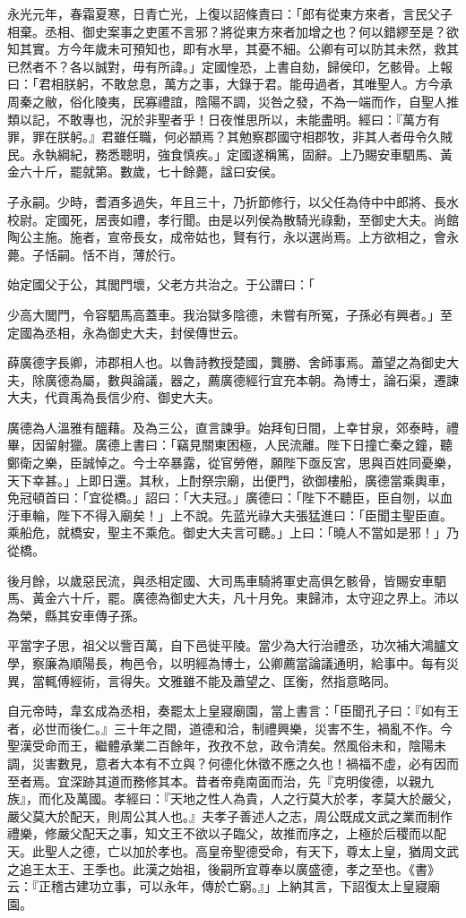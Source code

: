 \begin{pinyinscope}
永光元年，春霜夏寒，日青亡光，上復以詔條責曰：「郎有從東方來者，言民父子相棄。丞相、御史案事之吏匿不言邪？將從東方來者加增之也？何以錯繆至是？欲知其實。方今年歲未可預知也，即有水旱，其憂不細。公卿有可以防其未然，救其已然者不？各以誠對，毋有所諱。」定國惶恐，上書自劾，歸侯印，乞骸骨。上報曰：「君相朕躬，不敢怠息，萬方之事，大錄于君。能毋過者，其唯聖人。方今承周秦之敝，俗化陵夷，民寡禮誼，陰陽不調，災咎之發，不為一端而作，自聖人推類以記，不敢專也，況於非聖者乎！日夜惟思所以，未能盡明。經曰：『萬方有罪，罪在朕躬。』君雖任職，何必顓焉？其勉察郡國守相郡牧，非其人者毋令久賊民。永執綱紀，務悉聰明，強食慎疾。」定國遂稱篤，固辭。上乃賜安車駟馬、黃金六十斤，罷就第。數歲，七十餘薨，諡曰安侯。

子永嗣。少時，耆酒多過失，年且三十，乃折節修行，以父任為侍中中郎將、長水校尉。定國死，居喪如禮，孝行聞。由是以列侯為散騎光祿勳，至御史大夫。尚館陶公主施。施者，宣帝長女，成帝姑也，賢有行，永以選尚焉。上方欲相之，會永薨。子恬嗣。恬不肖，薄於行。

始定國父于公，其閭門壞，父老方共治之。于公謂曰：「

少高大閭門，令容駟馬高蓋車。我治獄多陰德，未嘗有所冤，子孫必有興者。」至定國為丞相，永為御史大夫，封侯傳世云。

薛廣德字長卿，沛郡相人也。以魯詩教授楚國，龔勝、舍師事焉。蕭望之為御史大夫，除廣德為屬，數與論議，器之，薦廣德經行宜充本朝。為博士，論石渠，遷諫大夫，代貢禹為長信少府、御史大夫。

廣德為人溫雅有醞藉。及為三公，直言諫爭。始拜旬日間，上幸甘泉，郊泰畤，禮畢，因留射獵。廣德上書曰：「竊見關東困極，人民流離。陛下日撞亡秦之鐘，聽鄭衛之樂，臣誠悼之。今士卒暴露，從官勞倦，願陛下亟反宮，思與百姓同憂樂，天下幸甚。」上即日還。其秋，上酎祭宗廟，出便門，欲御樓船，廣德當乘輿車，免冠頓首曰：「宜從橋。」詔曰：「大夫冠。」廣德曰：「陛下不聽臣，臣自刎，以血汙車輪，陛下不得入廟矣！」上不說。先蓝光祿大夫張猛進曰：「臣聞主聖臣直。乘船危，就橋安，聖主不乘危。御史大夫言可聽。」上曰：「曉人不當如是邪！」乃從橋。

後月餘，以歲惡民流，與丞相定國、大司馬車騎將軍史高俱乞骸骨，皆賜安車駟馬、黃金六十斤，罷。廣德為御史大夫，凡十月免。東歸沛，太守迎之界上。沛以為榮，縣其安車傳子孫。

平當字子思，祖父以訾百萬，自下邑徙平陵。當少為大行治禮丞，功次補大鴻臚文學，察廉為順陽長，栒邑令，以明經為博士，公卿薦當論議通明，給事中。每有災異，當輒傅經術，言得失。文雅雖不能及蕭望之、匡衡，然指意略同。

自元帝時，韋玄成為丞相，奏罷太上皇寢廟園，當上書言：「臣聞孔子曰：『如有王者，必世而後仁。』三十年之間，道德和洽，制禮興樂，災害不生，禍亂不作。今聖漢受命而王，繼體承業二百餘年，孜孜不怠，政令清矣。然風俗未和，陰陽未調，災害數見，意者大本有不立與？何德化休徵不應之久也！禍福不虛，必有因而至者焉。宜深跡其道而務修其本。昔者帝堯南面而治，先『克明俊德，以親九族』，而化及萬國。孝經曰：『天地之性人為貴，人之行莫大於孝，孝莫大於嚴父，嚴父莫大於配天，則周公其人也。』夫孝子善述人之志，周公既成文武之業而制作禮樂，修嚴父配天之事，知文王不欲以子臨父，故推而序之，上極於后稷而以配天。此聖人之德，亡以加於孝也。高皇帝聖德受命，有天下，尊太上皇，猶周文武之追王太王、王季也。此漢之始祖，後嗣所宜尊奉以廣盛德，孝之至也。《書》云：『正稽古建功立事，可以永年，傳於亡窮。』」上納其言，下詔復太上皇寢廟園。


\end{pinyinscope}
